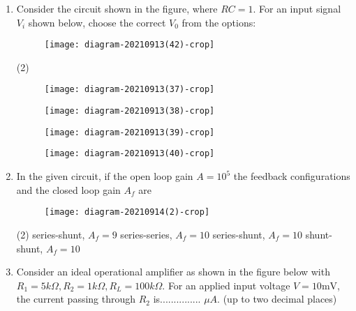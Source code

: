 \begin{enumerate}
 	{	}
 	\begin{tasks}(4)
 		\task[\textbf{A.}] $0.71$ and $45^{\circ}$
 		\task[\textbf{B.}]  $0.71$ and $-45^{\circ}$
 		\task[\textbf{C.}] $0.5$ and $-90^{\circ}$
 		\task[\textbf{D.}] $0.5$ and $90^{\circ}$
 	\end{tasks}
 	\item Consider the circuit shown in the figure, where $R C=1$. For an input signal $V_{i}$ shown below, choose the correct $V_{0}$ from the options:
 	{	}
 	\begin{figure}[H]
 		\centering
 		\texttt{[image: diagram-20210913(42)-crop]}
 	\end{figure}
 	\begin{tasks}(2)
 		\task[\textbf{A.}] \begin{figure}[H]
 			\centering
 			\texttt{[image: diagram-20210913(37)-crop]}
 		\end{figure}
 		\task[\textbf{B.}] \begin{figure}[H]
 			\centering
 			\texttt{[image: diagram-20210913(38)-crop]}
 		\end{figure}
 		\task[\textbf{C.}] \begin{figure}[H]
 			\centering
 			\texttt{[image: diagram-20210913(39)-crop]}
 		\end{figure}
 		\task[\textbf{D.}]\begin{figure}[H]
 			\centering
 			\texttt{[image: diagram-20210913(40)-crop]}
 		\end{figure}
 	\end{tasks}
 	\item In the given circuit, if the open loop gain $A=10^{5}$ the feedback configurations and the closed loop gain $A_{f}$ are
 	{	}
 	\begin{figure}[H]
 		\centering
 		\texttt{[image: diagram-20210914(2)-crop]}
 	\end{figure}
 	\begin{tasks}(2)
 		\task[\textbf{A.}] series-shunt, $A_{f}=9$
 		\task[\textbf{B.}] series-series, $A_{f}=10$
 		\task[\textbf{C.}] series-shunt, $A_{f}=10$
 		\task[\textbf{D.}] shunt-shunt, $A_{f}=10$
 	\end{tasks}
 	\item Consider an ideal operational amplifier as shown in the figure below with $R_{1}=5 k \Omega, R_{2}=1 k \Omega, R_{L}=100 k \Omega .$ For an applied input voltage $V=10 \mathrm{mV}$, the current passing through $R_{2}$ is............... $\mu A$. (up to two decimal places)

\end{enumerate}
